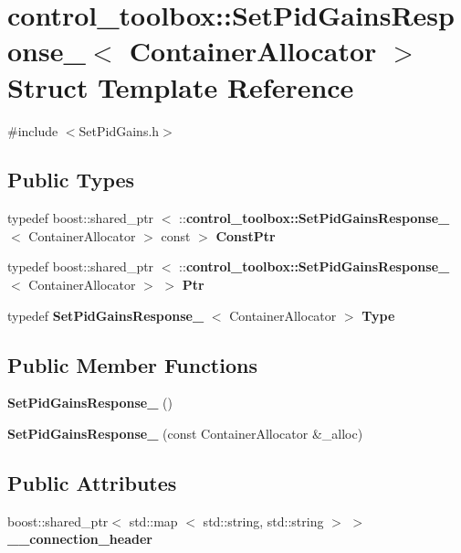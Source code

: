 \section{control\-\_\-toolbox\-:\-:\-Set\-Pid\-Gains\-Response\-\_\-$<$ \-Container\-Allocator $>$ \-Struct \-Template \-Reference}
\label{structcontrol__toolbox_1_1SetPidGainsResponse__}


{\ttfamily \#include $<$\-Set\-Pid\-Gains.\-h$>$}

\subsection*{\-Public \-Types}
\begin{DoxyCompactItemize}
\item 
typedef boost\-::shared\-\_\-ptr\*
$<$ \-::{\bf control\-\_\-toolbox\-::\-Set\-Pid\-Gains\-Response\-\_\-}\*
$<$ \-Container\-Allocator $>$ const  $>$ {\bf \-Const\-Ptr}
\item 
typedef boost\-::shared\-\_\-ptr\*
$<$ \-::{\bf control\-\_\-toolbox\-::\-Set\-Pid\-Gains\-Response\-\_\-}\*
$<$ \-Container\-Allocator $>$ $>$ {\bf \-Ptr}
\item 
typedef {\bf \-Set\-Pid\-Gains\-Response\-\_\-}\*
$<$ \-Container\-Allocator $>$ {\bf \-Type}
\end{DoxyCompactItemize}
\subsection*{\-Public \-Member \-Functions}
\begin{DoxyCompactItemize}
\item 
{\bf \-Set\-Pid\-Gains\-Response\-\_\-} ()
\item 
{\bf \-Set\-Pid\-Gains\-Response\-\_\-} (const \-Container\-Allocator \&\-\_\-alloc)
\end{DoxyCompactItemize}
\subsection*{\-Public \-Attributes}
\begin{DoxyCompactItemize}
\item 
boost\-::shared\-\_\-ptr$<$ std\-::map\*
$<$ std\-::string, std\-::string $>$ $>$ {\bf \-\_\-\-\_\-connection\-\_\-header}
\end{DoxyCompactItemize}


